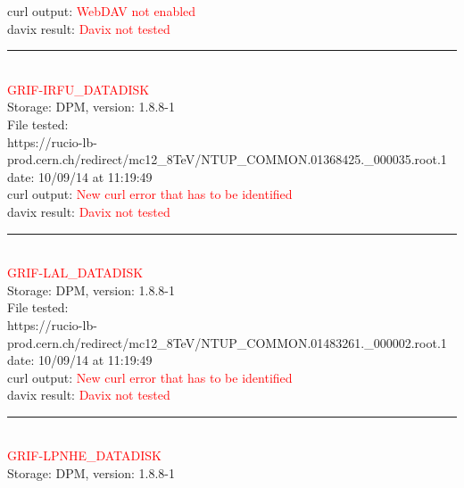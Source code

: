 curl output:  \textcolor{red}{WebDAV not enabled}\\

davix result:  \textcolor{red}{Davix not tested}\\

\rule{\textwidth}{1pt}\\

\textcolor{red}{\normalsize{GRIF-IRFU\_DATADISK}}\\

Storage: DPM, version: 1.8.8-1\\

File tested:\\
\footnotesize{https://rucio-lb-prod.cern.ch/redirect/mc12\_8TeV/NTUP\_COMMON.01368425.\_000035.root.1}\\

date: 10/09/14 at 11:19:49\\

curl output:  \textcolor{red}{New curl error that has to be identified}\\

davix result:  \textcolor{red}{Davix not tested}\\

\rule{\textwidth}{1pt}\\

\textcolor{red}{\normalsize{GRIF-LAL\_DATADISK}}\\

Storage: DPM, version: 1.8.8-1\\

File tested:\\
\footnotesize{https://rucio-lb-prod.cern.ch/redirect/mc12\_8TeV/NTUP\_COMMON.01483261.\_000002.root.1}\\

date: 10/09/14 at 11:19:49\\

curl output:  \textcolor{red}{New curl error that has to be identified}\\

davix result:  \textcolor{red}{Davix not tested}\\

\rule{\textwidth}{1pt}\\

\textcolor{red}{\normalsize{GRIF-LPNHE\_DATADISK}}\\

Storage: DPM, version: 1.8.8-1\\

